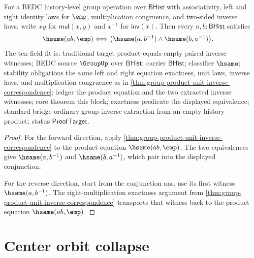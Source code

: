 \begin{theorem}
\label{thm:group-product-empty-unit-inverse-correspondence}
For a BEDC history-level group operation over $\mathsf{BHist}$ with
associativity, left and right identity laws for $\emp$, multiplication
congruence, and two-sided inverse laws, write $xy$ for
$\mathsf{mul}(x,y)$ and $x^{-1}$ for $\mathsf{inv}(x)$. Then every
$a,b:\mathsf{BHist}$ satisfies
$$
\hsame(ab,\emp)
\Longleftrightarrow
\bigl(\hsame(a,b^{-1})\land\hsame(b,a^{-1})\bigr).
$$
The ten-field fit is: traditional target product-equals-empty paired inverse
witnesses; BEDC source $\GroupUp$ over $\mathsf{BHist}$; carrier
$\mathsf{BHist}$; classifier $\hsame$; stability obligations the same left and
right equation exactness, unit laws, inverse laws, and multiplication
congruence as in
\autoref{thm:group-product-unit-inverse-correspondence}; ledger the product
equation and the two extracted inverse witnesses; core theorem this block;
exactness predicate the displayed equivalence; standard bridge ordinary group
inverse extraction from an empty-history product; status $\mathsf{ProofTarget}$.
\end{theorem}
\begin{proof}
For the forward direction, apply
\autoref{thm:group-product-unit-inverse-correspondence} to the product equation
$\hsame(ab,\emp)$. The two equivalences give $\hsame(a,b^{-1})$ and
$\hsame(b,a^{-1})$, which pair into the displayed conjunction.

For the reverse direction, start from the conjunction and use its first witness
$\hsame(a,b^{-1})$. The right-multiplication exactness argument from
\autoref{thm:group-product-unit-inverse-correspondence} transports that witness
back to the product equation $\hsame(ab,\emp)$.
\end{proof}

\section{Center orbit collapse}
\label{sec:group-center-orbit-collapse}

